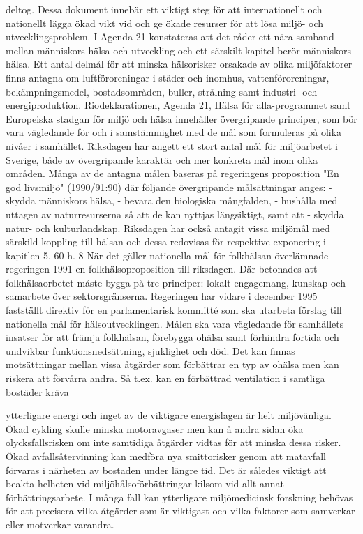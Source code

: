 deltog. Dessa dokument innebär ett viktigt steg för att internationellt och nationellt lägga ökad vikt vid och ge ökade resurser för att lösa miljö- och utvecklingsproblem.
I Agenda 21 konstateras att det råder ett nära samband mellan människors hälsa och utveckling och ett särskilt kapitel berör människors hälsa. Ett antal delmål för att minska hälsorisker orsakade av olika miljöfaktorer finns antagna om luftföroreningar i städer och inomhus, vattenföroreningar, bekämpningsmedel, bostadsområden, buller, strålning samt industri- och energiproduktion.
Riodeklarationen, Agenda 21, Hälsa för alla-programmet samt Europeiska stadgan för miljö och hälsa innehåller övergripande principer, som bör vara vägledande för och i samstämmighet med de mål som formuleras på olika nivåer i samhället.
Riksdagen har angett ett stort antal mål för miljöarbetet i Sverige, både av övergripande karaktär och mer konkreta mål inom olika områden. Många av de antagna målen baseras på regeringens proposition "En god livsmiljö" (1990/91:90) där följande övergripande målsättningar anges:
- skydda människors hälsa,
- bevara den biologiska mångfalden,
- hushålla med uttagen av naturresurserna så att de kan nyttjas längsiktigt, samt att
- skydda natur- och kulturlandskap.
Riksdagen har också antagit vissa miljömål med särskild koppling till hälsan och dessa redovisas för respektive exponering i kapitlen 5, 60 h. 8 När det gäller nationella mål för folkhälsan överlämnade regeringen 1991 en folkhälsoproposition till riksdagen. Där betonades att folkhälsaorbetet måste bygga på tre principer: lokalt engagemang, kunskap och samarbete över sektorsgränserna.
Regeringen har vidare i december 1995 fastställt direktiv för en parlamentarisk kommitté som ska utarbeta förslag till nationella mål för hälsoutvecklingen. Målen ska vara vägledande för samhällets insatser för att främja folkhälsan, förebygga ohälsa samt förhindra förtida och undvikbar funktionsnedsättning, sjuklighet och död.
Det kan finnas motsättningar mellan vissa åtgärder som förbättrar en typ av ohälsa men kan riskera att förvårra andra. Så t.ex. kan en förbättrad ventilation i samtliga bostäder kräva

ytterligare energi och inget av de viktigare energislagen är helt miljövänliga. Ökad cykling skulle minska motoravgaser men kan å andra sidan öka olycksfallsrisken om inte samtidiga åtgärder vidtas för att minska dessa risker. Ökad avfallsåtervinning kan medföra nya smittorisker genom att matavfall förvaras i närheten av bostaden under längre tid. Det är således viktigt att beakta helheten vid miljöhålsoförbättringar kilsom vid allt annat förbättringsarbete. I många fall kan ytterligare miljömedicinsk forskning behövas för att precisera vilka åtgärder som är viktigast och vilka faktorer som samverkar eller motverkar varandra.
